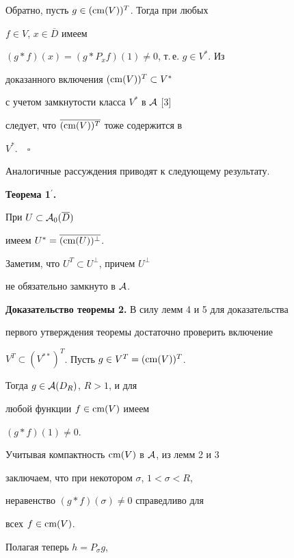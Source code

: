 Обратно, пусть $g\in (\operatorname{cm} (V))^T$. Тогда при любых 


$f\in V$, $x \in \overline{D}$ имеем 


$(g*f)(x)= (g*P_x f)(1) \neq 0$, т.\,е. $g\in V^*$. Из 


доказанного включения $(\operatorname{cm} (V))^T \subset V^*$ 


с учетом замкнутости класса $V^*$ в ${\cal A}$ [3]


следует, что $\overline{(\operatorname{cm} (V))^T}$  тоже содержится в 


$V^*.\quad\square$





Аналогичные рассуждения приводят к следующему результату.





{\bf Теорема 1${}^{\boldsymbol\prime}$.} {\it


При $U\subset {\cal A}_0 (\overline D)$ 


имеем $U^* = \overline{(\operatorname{cm} (U))^{\perp}}$.


}


\medskip





Заметим, что $U^T \subset U^{\perp}$, причем $U^{\perp}$ 


не обязательно замкнуто в ${\cal A}$.


\medskip





{\bf Доказательство теоремы 2.} В силу лемм 4 и 5 для доказательства 


первого утверждения теоремы достаточно проверить включение


$V^T \subset (V^{**})^T$. Пусть $g \in V^T = (\operatorname{cm} (V))^T$. 


Тогда $g\in {\cal A}(D_R)$, $R>1$, и для


любой функции $f \in \operatorname{cm} (V)$ имеем 


$(g * f)(1) \neq  0$. 


Учитывая компактность $\operatorname{cm} (V)$ в ${\cal A}$, из лемм 2 и 3 


заключаем, что при некотором $\sigma$, $1< \sigma< R$, 


неравенство $(g* f)(\sigma) \neq 0$ справедливо для


всех $f \in \operatorname{cm} (V)$. 


Полагая теперь $h=P_{\sigma} g$, 


